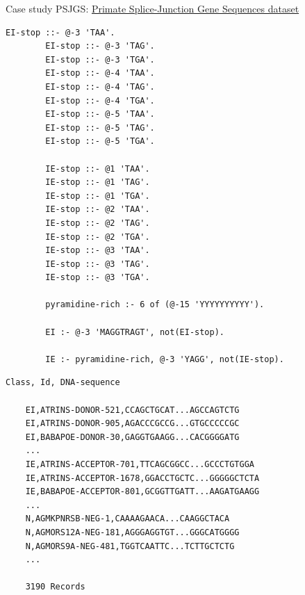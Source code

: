 \documentclass[presentation]{beamer}\mode<presentation>{\usetheme{AMSBolognaFC}}
\begin{document}
\begin{frame}{Case study}
    PSJGS: \href{https://archive.ics.uci.edu/ml/datasets/Molecular+Biology+(Splice-junction+Gene+Sequences)}{Primate Splice-Junction Gene Sequences dataset}
    \begin{minipage}{0.5\textwidth}
        \begin{lstlisting}[language={}, basicstyle=\ttfamily\tiny,frame=none]
        EI-stop ::- @-3 'TAA'.
        EI-stop ::- @-3 'TAG'.
        EI-stop ::- @-3 'TGA'.
        EI-stop ::- @-4 'TAA'.
        EI-stop ::- @-4 'TAG'.
        EI-stop ::- @-4 'TGA'.
        EI-stop ::- @-5 'TAA'.
        EI-stop ::- @-5 'TAG'.
        EI-stop ::- @-5 'TGA'.
        
        IE-stop ::- @1 'TAA'.
        IE-stop ::- @1 'TAG'.
        IE-stop ::- @1 'TGA'.
        IE-stop ::- @2 'TAA'.
        IE-stop ::- @2 'TAG'.
        IE-stop ::- @2 'TGA'.
        IE-stop ::- @3 'TAA'.
        IE-stop ::- @3 'TAG'.
        IE-stop ::- @3 'TGA'.
        
        pyramidine-rich :- 6 of (@-15 'YYYYYYYYYY').
        
        EI :- @-3 'MAGGTRAGT', not(EI-stop).
        
        IE :- pyramidine-rich, @-3 'YAGG', not(IE-stop).
        \end{lstlisting}
    \end{minipage}
    \vline
    \begin{minipage}{0.45\textwidth}
        \begin{lstlisting}[language={}, basicstyle=\ttfamily\tiny,frame=none]           
    Class, Id, DNA-sequence
    
    EI,ATRINS-DONOR-521,CCAGCTGCAT...AGCCAGTCTG
    EI,ATRINS-DONOR-905,AGACCCGCCG...GTGCCCCCGC
    EI,BABAPOE-DONOR-30,GAGGTGAAGG...CACGGGGATG
    ...
    IE,ATRINS-ACCEPTOR-701,TTCAGCGGCC...GCCCTGTGGA
    IE,ATRINS-ACCEPTOR-1678,GGACCTGCTC...GGGGGCTCTA
    IE,BABAPOE-ACCEPTOR-801,GCGGTTGATT...AAGATGAAGG
    ...
    N,AGMKPNRSB-NEG-1,CAAAAGAACA...CAAGGCTACA
    N,AGMORS12A-NEG-181,AGGGAGGTGT...GGGCATGGGG
    N,AGMORS9A-NEG-481,TGGTCAATTC...TCTTGCTCTG
    ...
    
    3190 Records
        \end{lstlisting}
    \end{minipage}
    
    \framebreak
    
    
    

\end{frame}
\end{document}
